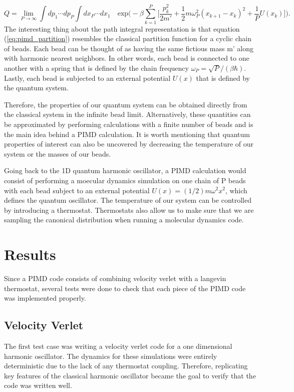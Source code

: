 \documentclass{article}
\newcommand{\be}{\begin{equation}}
\newcommand{\ee}{\end{equation}}
\begin{document}
\be \label{eq:pimd_partition}
  Q = \lim_{P \to\infty} \int dp_1 \cdots dp_P \int dx_P \cdots dx_1 \quad \text{exp}\Big( - \beta \sum_{k=1}^P \Big[ \frac{p^2_k}{2m'} + \frac{1}{2} m \omega^2_P (x_{k+1} - x_k)^2 + \frac{1}{P} U(x_k) \Big] \Big) .
\ee
The interesting thing about the path integral representation is that equation (\ref{eq:pimd_partition}) resembles the classical partition function for a cyclic chain of beads.
Each bead can be thought of as having the same fictious mass m' along with harmonic nearest neighbors.
In other words, each bead is connected to one another with a spring that is defined by the chain frequency $\omega_P = \sqrt{P}/(\beta \hbar)$.
Lastly, each bead is subjected to an external potential $U(x)$ that is defined by the quantum system.

Therefore, the properties of our quantum system can be obtained directly from the classical system in the infinite bead limit.
Alternatively, these quantities can be approximated by performing calculations with a finite number of beads and is the main idea behind a PIMD calculation.
It is worth mentioning that quantum properties of interest can also be uncovered by decreasing the temperature of our system or the masses of our beads.

Going back to the 1D quantum harmonic oscillator, a PIMD calculation would consist of performing a moecular dynamics simulation on one chain of P beads with each bead subject to an external potential $U(x) = (1/2)m \omega^2 x^2$, which defines the quantum oscillator.
The temperature of our system can be controlled by introducing a thermostat.
Thermostats also allow us to make sure that we are sampling the canonical distribution when running a molecular dynamics code.

\section{Results}
Since a PIMD code consists of combining velocity verlet with a langevin thermostat, several tests were done to check that each piece of the PIMD code was implemented properly.
\subsection{Velocity Verlet}

The first test case was writing a velocity verlet code for a one dimensional harmonic oscillator.
The dynamics for these simulations were entirely deterministic due to the lack of any thermostat coupling.
Therefore, replicating key features of the classical harmonic oscillator became the goal to verify that the code was written well.
\end{document}
